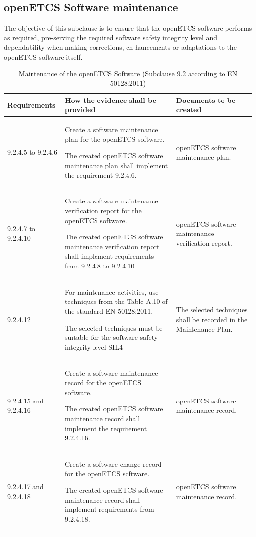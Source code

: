 \documentclass{template/openetcs_report}
\begin{document}
\subsection{openETCS Software maintenance}
\begin{flushleft}
The objective of this subclause is to ensure that the openETCS software performs as required, pre-serving the required software safety integrity level and dependability when making corrections, en-hancements or adaptations to the openETCS software itself. 
\end{flushleft}
{\footnotesize\sffamily\centering
\begin{longtable}{|p{2cm}|p{9cm}|p{3cm}|}
\caption{Maintenance of the openETCS Software (Subclause 9.2 according to EN 50128:2011)}\\
\hline
\bfseries Requirements & \bfseries How the evidence shall be provided & \bfseries Documents to be created\\
\hline
\hline
\endhead
\hline
\endfoot

9.2.4.5 to 9.2.4.6 & Create a software maintenance plan for the openETCS software.

The created openETCS software maintenance plan shall implement the requirement 9.2.4.6.
& openETCS software maintenance plan.\\ 
\hline
9.2.4.7 to 9.2.4.10 & Create a software maintenance verification report for the openETCS software.

The created openETCS software maintenance verification report shall implement requirements from 9.2.4.8 to 9.2.4.10.
& openETCS software maintenance verification report.\\ 
\hline
9.2.4.12 & For maintenance activities, use techniques from the Table A.10 of the standard EN 50128:2011.

The selected techniques must be suitable for the software safety integrity level SIL4 
& The selected techniques shall be recorded in the Maintenance Plan.\\ 
\hline
9.2.4.15 and 9.2.4.16 & Create a software maintenance record for the openETCS software.

The created openETCS software maintenance record shall implement the requirement 9.2.4.16.
& openETCS software maintenance record.\\ 
\hline
9.2.4.17 and 9.2.4.18 & Create a software change record for the openETCS software.

The created openETCS software maintenance record shall implement requirements from 9.2.4.18.
& openETCS software maintenance record.\\ 
\hline
\end{longtable}}
\end{document}
